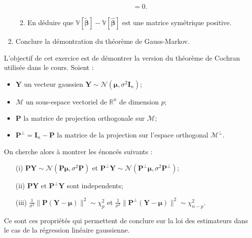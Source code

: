 \documentclass{../headers/td_upc}
\providecommand{\1}{\mathds{1}}
\begin{document}
\begin{enumerate}
\begin{enumerate}
{$$\begin{aligned}
= 0.
\end{aligned}
$$
}
\item En déduire que
$
\mathbb{V}[\tilde{\boldsymbol{\beta}}] - \mathbb{V}[\hat{\boldsymbol{\beta}}]
$ est une matrice symétrique positive.
	\end{enumerate}
	\item Conclure la démontration du théorème de Gauss-Markov.
	\end{enumerate}

  L'objectif de cet exercice est de démontrer la version du 
	théorème de Cochran utilisée dans le cours. 
	Soient :
	\begin{itemize}
	\item $\mathbf{Y}$ un vecteur gaussien $\mathbf{Y} \sim \mathcal{N}(\boldsymbol{\mu}, \sigma^2\mathbf{I}_n)$;
  \item $\mathcal{M}$ un sous-espace vectoriel de $\mathbb{R}^n$ de dimension $p$;
  \item $\mathbf{P}$ la matrice de projection orthogonale sur $\mathcal{M}$;
  \item $\mathbf{P}^{\bot} = \mathbf{I}_n - \mathbf{P}$ la matrice de la projection sur l'espace orthogonal $\mathcal{M}^{\bot}$.
	\end{itemize}
	On cherche alors à montrer les énoncés suivants :
	\begin{itemize}
	\item[(i)] $\mathbf{P}\mathbf{Y} \sim \mathcal{N}(\mathbf{P}\boldsymbol{\mu}, \sigma^2\mathbf{P})$
et
$\mathbf{P}^{\bot}\mathbf{Y} \sim \mathcal{N}(\mathbf{P}^{\bot}\boldsymbol{\mu}, \sigma^2\mathbf{P}^{\bot})$;
	\item[(ii)] $\mathbf{P}\mathbf{Y}$ et $\mathbf{P}^{\bot}\mathbf{Y}$ sont independents;
	\item[(iii)]
$\frac{1}{\sigma^2}\|\mathbf{P}(\mathbf{Y} - \boldsymbol{\mu}) \|^2 \sim \chi^2_{p}$
et
$\frac{1}{\sigma^2}\|\mathbf{P}^{\bot}(\mathbf{Y} - \boldsymbol{\mu}) \|^2 \sim \chi^2_{n - p}$.
	\end{itemize}
	Ce sont ces propriétés qui permettent de conclure sur la loi des estimateurs dans le
	cas de la régression linéaire gaussienne.
\end{document}
